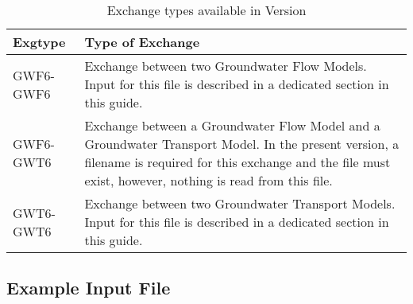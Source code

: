 \begin{table}[h]
\caption{Exchange types available in Version \modflowversion}
\small
\begin{center}
\begin{tabular*}{\columnwidth}{l p{15cm}}
\hline
\hline
Exgtype & Type of Exchange \\
\hline
GWF6-GWF6 & Exchange between two Groundwater Flow Models.  Input for this file is described in a dedicated section in this guide. \\
GWF6-GWT6 & Exchange between a Groundwater Flow Model and a Groundwater Transport Model.  In the present version, a filename is required for this exchange and the file must exist, however, nothing is read from this file.  \\
GWT6-GWT6 & Exchange between two Groundwater Transport Models.  Input for this file is described in a dedicated section in this guide. \\
\hline
\end{tabular*}
\label{table:exgtype}
\end{center}
\normalsize
\end{table}

\vspace{5mm}
\subsection{Example Input File}


